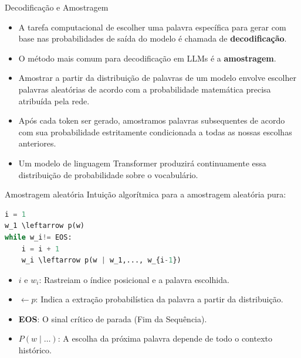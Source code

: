 \documentclass[aspectratio=169]{beamer}
\begin{document}
\begin{frame}{Decodificação e Amostragem}\justifying
    \begin{itemize}
        \item A tarefa computacional de escolher uma palavra específica para gerar com base nas probabilidades de saída do modelo é chamada de \textbf{decodificação}.
        \item O método mais comum para decodificação em LLMs é a \textbf{amostragem}.
        \item Amostrar a partir da distribuição de palavras de um modelo envolve escolher palavras aleatórias de acordo com a probabilidade matemática precisa atribuída pela rede.
        \item Após cada token ser gerado, amostramos palavras subsequentes de acordo com sua probabilidade estritamente condicionada a todas as nossas escolhas anteriores.
        \item Um modelo de linguagem Transformer produzirá continuamente essa distribuição de probabilidade sobre o vocabulário.
    \end{itemize}
\end{frame}

\begin{frame}[fragile]{Amostragem aleatória}\justifying
    Intuição algorítmica para a amostragem aleatória pura:
    \vspace{0.5cm}
\begin{lstlisting}[language=Python, basicstyle=\ttfamily\small, backgroundcolor=\color{gray!10}, keywordstyle=\color{blue}]
i = 1
w_1 \leftarrow p(w)
while w_i!= EOS:
    i = i + 1
    w_i \leftarrow p(w | w_1,..., w_{i-1})
\end{lstlisting}
    \vspace{0.5cm}
    \begin{itemize}
        \item $i$ e $w_i$: Rastreiam o índice posicional e a palavra escolhida.
        \item $\leftarrow p$: Indica a extração probabilística da palavra a partir da distribuição.
        \item \textbf{EOS}: O sinal crítico de parada (Fim da Sequência).
        \item $P(w \mid \dots)$: A escolha da próxima palavra depende de todo o contexto histórico.
    \end{itemize}
\end{frame}
\end{document}
